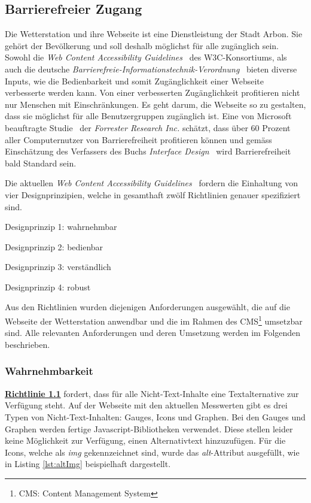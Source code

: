 \subsection{Barrierefreier Zugang}
Die Wetterstation und ihre Webseite ist eine Dienstleistung der Stadt Arbon. Sie gehört der Bevölkerung und soll deshalb möglichst für alle zugänglich sein. Sowohl die \emph{Web Content Accessibility Guidelines}~\cite{w3cwcag} des W3C-Konsortiums, als auch die deutsche \emph{Barrierefreie-Informationstechnik-Verordnung}~\cite{BITVde} bieten diverse Inputs, wie die Bedienbarkeit und somit Zugänglichkeit einer Webseite verbesserte werden kann. Von einer verbesserten Zugänglichkeit profitieren nicht nur Menschen mit Einschränkungen. Es geht darum, die Webseite so zu gestalten, dass sie möglichst für alle Benutzergruppen zugänglich ist. Eine von Microsoft beauftragte Studie~\cite{ForresterResearch2004E:Abilities} der \emph{Forrester Research Inc.} schätzt, dass über 60 Prozent aller Computernutzer von Barrierefreiheit profitieren können und gemäss Einschätzung des Verfassers des Buchs \emph{Interface Design}~\cite{ThesmannStephan2016ID:U} wird Barrierefreiheit bald Standard sein.

\noindent
Die aktuellen \emph{Web Content Accessibility Guidelines}~\cite{w3cwcag} fordern die Einhaltung von vier Designprinzipien, welche in gesamthaft zwölf Richtlinien genauer spezifiziert sind.

\begin{itemize*}
\item Designprinzip 1: wahrnehmbar
\item Designprinzip 2: bedienbar
\item Designprinzip 3: verständlich
\item Designprinzip 4: robust
\end{itemize*}

\noindent
Aus den Richtlinien wurden diejenigen Anforderungen ausgewählt, die auf die Webseite der Wetterstation anwendbar und die im Rahmen des CMS\footnote{CMS: Content Management System} umsetzbar sind. Alle relevanten Anforderungen und deren Umsetzung werden im Folgenden beschrieben.

\subsubsection{Wahrnehmbarkeit}
\href{https://www.w3.org/Translations/WCAG20-de/#text-equiv}{\textbf{Richtlinie 1.1}} fordert, dass für alle Nicht-Text-Inhalte eine Textalternative zur Verfügung steht. Auf der Webseite mit den aktuellen Messwerten gibt es drei Typen von Nicht-Text-Inhalten: Gauges, Icons und Graphen. Bei den Gauges und Graphen werden fertige Javascript-Bibliotheken verwendet. Diese stellen leider keine Möglichkeit zur Verfügung, einen Alternativtext hinzuzufügen. Für die Icons, welche als \emph{img} gekennzeichnet sind, wurde das \emph{alt}-Attribut ausgefüllt, wie in Listing \ref{lst:altImg} beispielhaft dargestellt.

